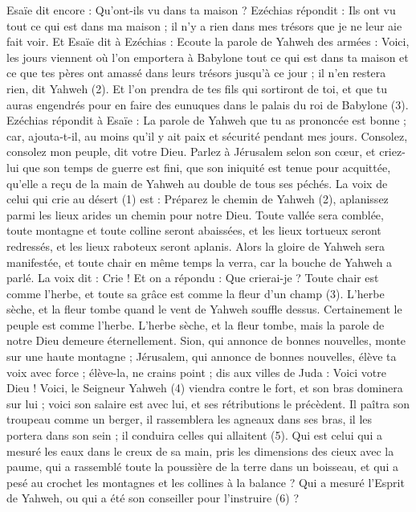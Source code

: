 \begin{multicols}{2}
Esaïe dit encore : Qu'ont-ils vu dans ta maison ? Ezéchias répondit : Ils ont vu tout ce qui est dans ma maison ; il n'y a rien dans mes trésors que je ne leur aie fait voir.
Et Esaïe dit à Ezéchias : Ecoute la parole de Yahweh des armées :
Voici, les jours viennent où l’on emportera à Babylone tout ce qui est dans ta maison et ce que tes pères ont amassé dans leurs trésors jusqu'à ce jour ; il n'en restera rien, dit Yahweh (2).
Et l’on prendra de tes fils qui sortiront de toi, et que tu auras engendrés pour en faire des eunuques dans le palais du roi de Babylone (3).
Ezéchias répondit à Esaïe : La parole de Yahweh que tu as prononcée est bonne ; car, ajouta-t-il, au moins qu'il y ait paix et sécurité pendant mes jours.
\VerseOne{}Consolez, consolez mon peuple, dit votre Dieu.
Parlez à Jérusalem selon son cœur, et criez-lui que son temps de guerre est fini, que son iniquité est tenue pour acquittée, qu'elle a reçu de la main de Yahweh au double de tous ses péchés.
La voix de celui qui crie au désert (1) est : Préparez le chemin de Yahweh (2), aplanissez parmi les lieux arides un chemin pour notre Dieu.
Toute vallée sera comblée, toute montagne et toute colline seront abaissées, et les lieux tortueux seront redressés, et les lieux raboteux seront aplanis.
Alors la gloire de Yahweh sera manifestée, et toute chair en même temps la verra, car la bouche de Yahweh a parlé.
La voix dit : Crie ! Et on a répondu : Que crierai-je ? Toute chair est comme l'herbe, et toute sa grâce est comme la fleur d'un champ (3).
L'herbe sèche, et la fleur tombe quand le vent de Yahweh souffle dessus. Certainement le peuple est comme l'herbe.
L'herbe sèche, et la fleur tombe, mais la parole de notre Dieu demeure éternellement.
Sion, qui annonce de bonnes nouvelles, monte sur une haute montagne ; Jérusalem, qui annonce de bonnes nouvelles, élève ta voix avec force ; élève-la, ne crains point ; dis aux villes de Juda : Voici votre Dieu !
Voici, le Seigneur Yahweh (4) viendra contre le fort, et son bras dominera sur lui ; voici son salaire est avec lui, et ses rétributions le précèdent.
Il paîtra son troupeau comme un berger, il rassemblera les agneaux dans ses bras, il les portera dans son sein ; il conduira celles qui allaitent (5).
Qui est celui qui a mesuré les eaux dans le creux de sa main, pris les dimensions des cieux avec la paume, qui a rassemblé toute la poussière de la terre dans un boisseau, et qui a pesé au crochet les montagnes et les collines à la balance ?
Qui a mesuré l'Esprit de Yahweh, ou qui a été son conseiller pour l’instruire (6) ?

\end{multicols}
